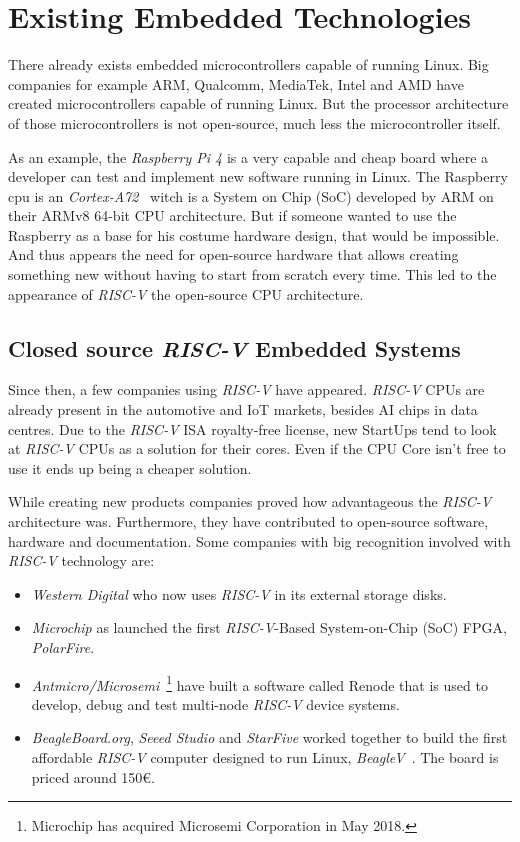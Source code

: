 \chapter{Existing Embedded Technologies}
\label{chapter:existing_embedded_technologies}
There already exists embedded microcontrollers capable of running Linux. Big companies for example ARM, Qualcomm, MediaTek, Intel and AMD have created microcontrollers capable of running Linux. But the processor architecture of those microcontrollers is not open-source, much less the microcontroller itself.

As an example, the \textit{Raspberry Pi 4} is a very capable and cheap board where a developer can test and implement new software running in Linux. The Raspberry \acrshort{cpu} is an \textit{Cortex-A72}~\cite{cortex_a72} witch is a System on Chip (SoC) developed by ARM on their ARMv8 64-bit CPU architecture. But if someone wanted to use the Raspberry as a base for his costume hardware design, that would be impossible. And thus appears the need for open-source hardware that allows creating something new without having to start from scratch every time. This led to the appearance of \textit{RISC-V} the open-source CPU architecture.


\section{Closed source \textit{RISC-V} Embedded Systems}
\label{section:closed_source}
Since then, a few companies using \textit{RISC-V} have appeared. \textit{RISC-V} CPUs are already present in the automotive and IoT markets, besides AI chips in data centres. Due to the \textit{RISC-V} ISA royalty-free license, new StartUps tend to look at \textit{RISC-V} CPUs as a solution for their cores. Even if the CPU Core isn't free to use it ends up being a cheaper solution.

While creating new products companies proved how advantageous the \textit{RISC-V} architecture was. Furthermore, they have contributed to open-source software, hardware and documentation. Some companies with big recognition involved with \textit{RISC-V} technology are:
\begin{itemize}
    \item \textit{Western Digital} who now uses \textit{RISC-V} in its external storage disks.
    \item \textit{Microchip} as launched the first \textit{RISC-V}-Based System-on-Chip (SoC) FPGA, \textit{PolarFire}.
    \item \textit{Antmicro/Microsemi}~\footnote{Microchip has acquired Microsemi Corporation in May 2018.} have built a software called Renode that is used to develop, debug and test multi-node \textit{RISC-V} device systems.
    \item \textit{BeagleBoard.org}, \textit{Seeed Studio} and \textit{StarFive} worked together to build the first affordable \textit{RISC-V} computer designed to run Linux, \textit{BeagleV}~\cite{beagleV}. The board is priced around 150€.
\end{itemize}

